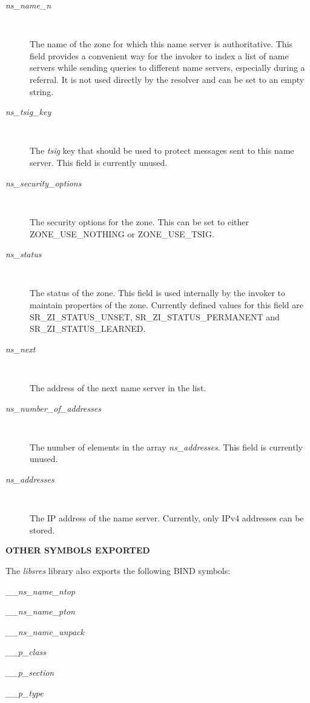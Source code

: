 \begin{description}

\item [{\it ns\_name\_n}]\verb" "

The name of the zone for which this name server is authoritative.  This field
provides a convenient way for the invoker to index a list of name servers
while sending queries to different name servers, especially during a referral.
It is not used directly by the resolver and can be set to an empty string.

\item [{\it ns\_tsig\_key}]\verb" "

The {\it tsig} key that should be used to protect messages sent to this name
server.  This field is currently unused.

\item [{\it ns\_security\_options}]\verb" "

The security options for the zone.  This can be set to either ZONE\_USE\_NOTHING
or ZONE\_USE\_TSIG.

\item [{\it ns\_status}]\verb" "

The status of the zone.  This field is used internally by the invoker to
maintain properties of the zone.  Currently defined values for this field are
SR\_ZI\_STATUS\_UNSET, SR\_ZI\_STATUS\_PERMANENT and SR\_ZI\_STATUS\_LEARNED.

\item [{\it ns\_next}]\verb" "

The address of the next name server in the list.

\item [{\it ns\_number\_of\_addresses}]\verb" "

The number of elements in the array {\it ns\_addresses}.  This field is
currently unused.

\item [{\it ns\_addresses}]\verb" "

The IP address of the name server.  Currently, only IPv4 addresses can be
stored.

\end{description}

{\bf OTHER SYMBOLS EXPORTED}

The {\it libsres} library also exports the following BIND symbols:
\begin{packed}
\item {\it \_\_ns\_name\_ntop}
\item {\it \_\_ns\_name\_pton}
\item {\it \_\_ns\_name\_unpack}
\item {\it \_\_p\_class}
\item {\it \_\_p\_section}
\item {\it \_\_p\_type}
\end{packed}

